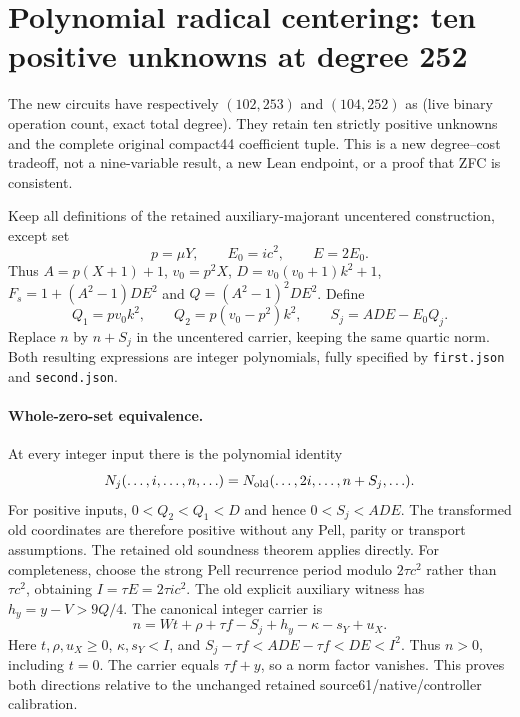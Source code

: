 \section{Polynomial radical centering: ten positive unknowns at degree 252}
The new circuits have respectively $(102,253)$ and $(104,252)$ as
(live binary operation count, exact total degree). They retain ten strictly
positive unknowns and the complete original compact44 coefficient tuple.
This is a new degree--cost tradeoff, not a nine-variable result, a new Lean
endpoint, or a proof that ZFC is consistent.

Keep all definitions of the retained auxiliary-majorant uncentered
construction, except set
\[
p=\mu Y,\qquad E_0=ic^2,\qquad E=2E_0.
\]
Thus $A=p(X+1)+1$, $v_0=p^2X$,
$D=v_0(v_0+1)k^2+1$, $F_s=1+(A^2-1)DE^2$ and
$Q=(A^2-1)^2DE^2$. Define
\[
Q_1=pv_0k^2,\qquad Q_2=p(v_0-p^2)k^2,
\qquad S_j=ADE-E_0Q_j.
\]
Replace $n$ by $n+S_j$ in the uncentered carrier, keeping the same quartic
norm. Both resulting expressions are integer polynomials, fully specified
by \texttt{first.json} and \texttt{second.json}.

\paragraph{Whole-zero-set equivalence.}
At every integer input there is the polynomial identity
\[
N_j(\ldots,i,\ldots,n,\ldots)
 =N_{\rm old}(\ldots,2i,\ldots,n+S_j,\ldots).
\]
For positive inputs, $0<Q_2<Q_1<D$ and hence
$0<S_j<ADE$. The transformed old coordinates are therefore positive
without any Pell, parity or transport assumptions. The retained old
soundness theorem applies directly.
For completeness, choose the strong Pell recurrence period modulo
$2\tau c^2$ rather than $\tau c^2$, obtaining
$I=\tau E=2\tau ic^2$. The old explicit auxiliary witness has
$h_y=y-V>9Q/4$. The canonical integer carrier is
\[
n=Wt+\rho+\tau f-S_j+h_y-\kappa-s_Y+u_X.
\]
Here $t,\rho,u_X\geq0$, $\kappa,s_Y<I$, and
$S_j-\tau f<ADE-\tau f<DE<I^2$. Thus $n>0$, including $t=0$.
The carrier equals $\tau f+y$, so a norm factor vanishes.
This proves both directions relative to the unchanged retained
source61/native/controller calibration.


